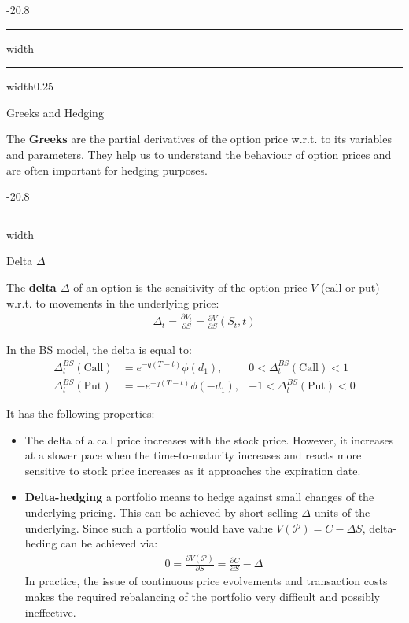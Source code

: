\documentclass[a4paper,landscape,7pt,fleqn]{scrartcl}
\makeatletter
\renewcommand{\emph}[1]{\textbf{#1}}
\renewcommand{\subsection}{\@startsection{subsection}{1}{0mm}%
{-2\baselineskip}{0.8\baselineskip}%
{\hrule depth 0.2pt width\columnwidth\hrule depth0.75pt
width0.25\columnwidth\vspace*{1.2em}\large\bfseries}}
\renewcommand{\subsubsection}{\@startsection{subsubsection}{1}{0mm}%
{-2\baselineskip}{0.8\baselineskip}%
{\hrule depth 0.2pt width\columnwidth\vspace*{1.2em}\normalsize\bfseries}}
\makeatother
\begin{document}
\begin{multicols*}{3}
\subsection{Greeks and Hedging}

The \emph{Greeks} are the partial derivatives of the option price w.r.t. to its variables and parameters. They help us to understand the behaviour of option prices and are often important for hedging purposes.

\subsubsection{Delta $\Delta$}

The \emph{delta $\Delta$} of an option is the sensitivity of the option price $V$ (call or put) w.r.t. to movements in the underlying price:
\begin{align*}
\Delta_t = \frac{\partial V_t}{\partial S} = \frac{\partial V}{\partial S}(S_t,t)
\end{align*}

In the BS model, the delta is equal to:
\begin{align*}
\Delta_t^{BS}(\text{Call}) &= e^{-q (T-t)} \phi(d_1), & 0 < \Delta_t^{BS}(\text{Call}) < 1 \\
\Delta_t^{BS}(\text{Put}) &= -e^{-q (T-t)} \phi(-d_1), & -1 < \Delta_t^{BS}(\text{Put}) < 0
\end{align*}

It has the following properties:
\begin{itemize}
\item The delta of a call price increases with the stock price. However, it increases at a slower pace when the time-to-maturity increases and reacts more sensitive to stock price increases as it approaches the expiration date.
\item \emph{Delta-hedging} a portfolio means to hedge against small changes of the underlying pricing. This can be achieved by short-selling $\Delta$ units of the underlying. Since such a portfolio would have value $V(\mathcal{P}) = C - \Delta S$, delta-heding can be achieved via:
\begin{align*}
0 = \frac{\partial V(\mathcal{P})}{\partial S} = \frac{\partial C}{\partial S} - \Delta
\end{align*}
In practice, the issue of continuous price evolvements and transaction costs makes the required rebalancing of the portfolio very difficult and possibly ineffective.
\end{itemize}


\end{multicols*}
\end{document}
